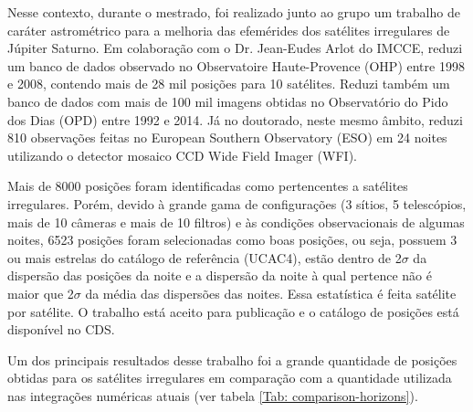 \documentclass[12pt,a4paper]{monografia}
\begin{document}
Nesse contexto, durante o mestrado, foi realizado junto ao grupo um trabalho de caráter astrométrico para a melhoria das efemérides dos satélites irregulares de Júpiter Saturno. Em colaboração com o Dr. Jean-Eudes Arlot do IMCCE, reduzi um banco de dados observado no Observatoire Haute-Provence (OHP) entre 1998 e 2008, contendo mais de 28 mil posições para 10 satélites. Reduzi também um banco de dados com mais de 100 mil imagens obtidas no Observatório do Pido dos Dias (OPD) entre 1992 e 2014. Já no doutorado, neste mesmo âmbito, reduzi 810 observações feitas no European Southern Observatory (ESO) em 24 noites utilizando o detector mosaico CCD Wide Field Imager (WFI).

Mais de 8000 posições foram identificadas como pertencentes a satélites irregulares. Porém, devido à grande gama de configurações (3 sítios, 5 telescópios, mais de 10 câmeras e mais de 10 filtros) e às condições observacionais de algumas noites, 6523 posições foram selecionadas como boas posições, ou seja, possuem 3 ou mais estrelas do catálogo de referência (UCAC4), estão dentro de 2$\sigma$ da dispersão das posições da noite e a dispersão da noite à qual pertence não é maior que 2$\sigma$ da média das dispersões das noites. Essa estatística é feita satélite por satélite. O trabalho está aceito para publicação \citep{GomesJunior2015-Irregular} e o catálogo de posições está disponível no CDS.

Um dos principais resultados desse trabalho foi a grande quantidade de posições obtidas para os satélites irregulares em comparação com a quantidade utilizada nas integrações numéricas atuais (ver tabela \ref{Tab: comparison-horizons}).
\end{document}
